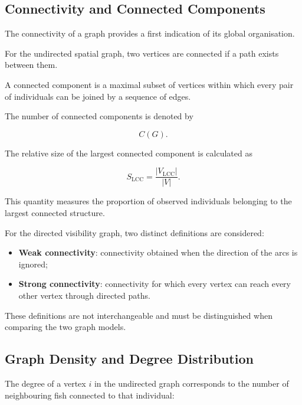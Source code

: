 \documentclass[10pt,a4paper]{article}
\begin{document}
\subsection{Connectivity and Connected Components}

The connectivity of a graph provides a first indication
of its global organisation.

For the undirected spatial graph, two vertices are
connected if a path exists between them.

A connected component is a maximal subset of vertices
within which every pair of individuals can be joined
by a sequence of edges.

The number of connected components is denoted by

\begin{equation}
C(G).
\end{equation}

The relative size of the largest connected component
is calculated as

\begin{equation}
S_{\mathrm{LCC}}=
\frac{|V_{\mathrm{LCC}}|}{|V|}.
\end{equation}

This quantity measures the proportion of observed
individuals belonging to the largest connected
structure.

For the directed visibility graph, two distinct
definitions are considered:

\begin{itemize}

\item \textbf{Weak connectivity}: connectivity obtained
when the direction of the arcs is ignored;

\item \textbf{Strong connectivity}: connectivity for
which every vertex can reach every other vertex
through directed paths.

\end{itemize}

These definitions are not interchangeable and must
be distinguished when comparing the two graph models.

\subsection{Graph Density and Degree Distribution}

The degree of a vertex $i$ in the undirected graph
corresponds to the number of neighbouring fish
connected to that individual:
\end{document}

